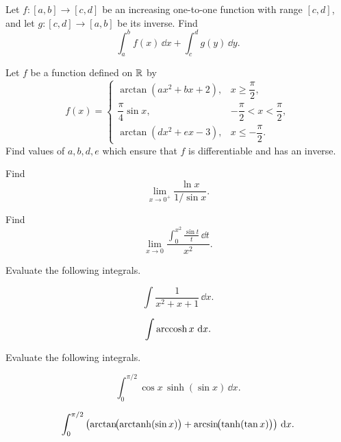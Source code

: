 \begin{problem}
\begin{problemsubparts}
\item Let $f\colon[a, b]\to[c, d]$ be an increasing one-to-one function with range $[c, d]$, and let $g\colon[c, d]\to[a, b]$ be its inverse. Find
\[
\int_a^b f(x)\,\dd x+\int_c^d g(y)\,\dd y.
\]
\item Let $f$ be a function defined on $\mathbb{R}$ by
\[
f(x)=
\begin{cases}
\arctan(ax^2+bx+2), & x\ge \dfrac{\pi}{2}, \\[0.6em]
\dfrac{\pi}{4}\sin x, & -\dfrac{\pi}{2}<x<\dfrac{\pi}{2}, \\[0.8em]
\arctan(dx^2+ex-3), & x\le-\dfrac{\pi}{2}.
\end{cases}
\]
Find values of $a, b, d, e$ which ensure that $f$ is differentiable and has an inverse.
\end{problemsubparts}
\end{problem}

\begin{problem}
\begin{problemsubparts}
\item Find
\[
\lim_{x\to0^+}\frac{\ln x}{1/\sin x}.
\]
\item Find
\[
\lim_{x\to0}
\frac{\displaystyle\int_0^{x^2}\frac{\sin t}{t}\,\dd t}{x^2}.
\]
\end{problemsubparts}
\end{problem}

\begin{problem}
Evaluate the following integrals.
\begin{problemsubparts}
\item
\[
\int\frac{1}{x^2+x+1}\,\dd x.
\]
\item
\[
\int\operatorname{arccosh} x\,\mathop{}\!\mathrm{d} x.
\]
\end{problemsubparts}
\end{problem}

\begin{problem}
Evaluate the following integrals.
\begin{problemsubparts}
\item
\[
\int_0^{\pi/2}\cos x\,\sinh(\sin x)\,\dd x.
\]
\item
\[
\int_0^{\pi/2}
\left(
\arctan\!\bigl(\operatorname{arctanh}(\sin x)\bigr)
+\arcsin\!\bigl(\tanh(\tan x)\bigr)
\right)\,\mathop{}\!\mathrm{d} x.
\]
\end{problemsubparts}
\end{problem}

